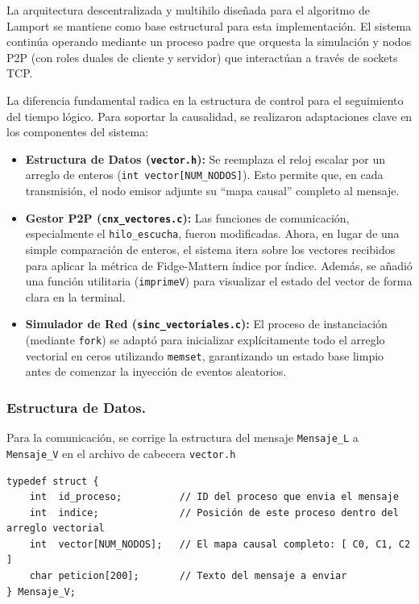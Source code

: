 La arquitectura descentralizada y multihilo diseñada para el algoritmo de Lamport se mantiene como base estructural para esta implementación. El sistema continúa operando mediante un proceso padre que orquesta la simulación y nodos P2P (con roles duales de cliente y servidor) que interactúan a través de sockets TCP.

La diferencia fundamental radica en la estructura de control para el seguimiento del tiempo lógico. Para soportar la causalidad, se realizaron adaptaciones clave en los componentes del sistema:

\begin{itemize}
    \item \textbf{Estructura de Datos (\texttt{vector.h}):} Se reemplaza el reloj escalar por un arreglo de enteros (\texttt{int vector[NUM\_NODOS]}). Esto permite que, en cada transmisión, el nodo emisor adjunte su ``mapa causal'' completo al mensaje.
    \item \textbf{Gestor P2P (\texttt{cnx\_vectores.c}):} Las funciones de comunicación, especialmente el \texttt{hilo\_escucha}, fueron modificadas. Ahora, en lugar de una simple comparación de enteros, el sistema itera sobre los vectores recibidos para aplicar la métrica de Fidge-Mattern índice por índice. Además, se añadió una función utilitaria (\texttt{imprimeV}) para visualizar el estado del vector de forma clara en la terminal.
    \item \textbf{Simulador de Red (\texttt{sinc\_vectoriales.c}):} El proceso de instanciación (mediante \texttt{fork}) se adaptó para inicializar explícitamente todo el arreglo vectorial en ceros utilizando \texttt{memset}, garantizando un estado base limpio antes de comenzar la inyección de eventos aleatorios.
\end{itemize}

\subsubsection{Estructura de Datos.}
Para la comunicación, se corrige la estructura del mensaje \texttt{Mensaje\_L} a \texttt{Mensaje\_V} en el archivo de cabecera \texttt{vector.h}

\begin{lstlisting}[style=estiloC]
typedef struct {
    int  id_proceso;          // ID del proceso que envia el mensaje
    int  indice;              // Posición de este proceso dentro del arreglo vectorial
    int  vector[NUM_NODOS];   // El mapa causal completo: [ C0, C1, C2 ]
    char peticion[200];       // Texto del mensaje a enviar
} Mensaje_V;
\end{lstlisting}

